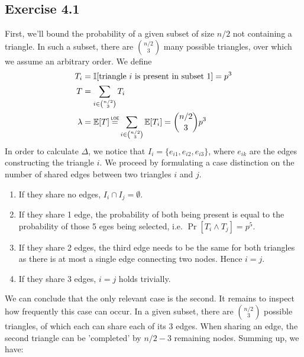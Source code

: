 \documentclass[a4paper,german]{article}
\newcommand\loe{\mathrel{\overset{\makebox[0pt]{\mbox{\normalfont\tiny\sffamily LOE}}}{=}}}
\newcommand{\E}{\mathbb{E}}
\begin{document}
\subsection*{Exercise 4.1}
First, we'll bound the probability of a given subset of size \(n/2\) not containing a triangle. In such a subset, there are \( {n/2 \choose 3}\) many possible triangles, over which we assume an arbitrary order. We define 
\begin{align*} 
T_i &= \mathbb{I} [\text{triangle } i \text{ is present in subset } 1] = p^3 \\
T &= \sum_{i \in {n/2 \choose 3}} T_i \\
\lambda &= \E[T] \loe \sum_{i \in {n/2 \choose 3}} \E[T_i] = {n/2 \choose 3} p^3
\end{align*}
In order to calculate \(\Delta\), we notice that \(I_i = \{e_{i1}, e_{i2}, e_{i3} \}\), where \(e_{ik}\) are the edges constructing the triangle \(i\). We proceed by formulating a case distinction on the number of shared edges between two triangles \(i\) and \(j\).
\begin{enumerate}
\item If  they share no edges, \(I_i \cap I_j = \emptyset \).
\item If they share 1 edge, the probability of both being present is equal to the probability of those 5 eges being selected, i.e. \(\Pr[T_i \wedge T_j] = p^5\).
\item If they share 2 edges, the third edge needs to be the same for both triangles as there is at most a single edge connecting two nodes. Hence \(i = j\).
\item If they share 3 edges, \(i = j\) holds trivially. 
\end{enumerate}
We can conclude that the only relevant case is the second. It remains to inspect how frequently this case can occur. In a given subset, there are \( {n/2 \choose 3} \) possible triangles, of which each can share each of its 3 edges. When sharing an edge, the second triangle can be 'completed' by \(n/2 -3\) remaining nodes. Summing up, we have:
\end{document}
